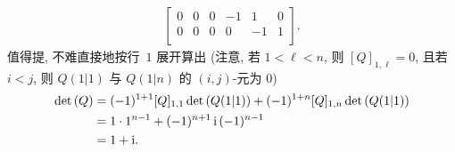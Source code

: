 \documentclass[../libro.tex]{subfiles}
\begin{document}
\begin{example}
\begin{align*}
\begin{bmatrix}
            0  & 0  & 0  & -1 & 1  & 0          \\
            0  & 0  & 0  & 0  & -1 & 1          \\
        \end{bmatrix}.
    \end{align*}
    值得提, 不难直接地按行~\(1\) 展开算出
    (注意, 若 \(1 < \ell < n\), %
    则 \([Q]_{1,\ell} = 0\),
    且若 \(i < j\),
    则 \(Q(1|1)\) 与 \(Q(1|n)\) 的
    \((i, j)\)-元为 \(0\)) %
    \begin{align*}
        \det {(Q)}
        = {} &
        (-1)^{1+1} [Q]_{1,1} \det {(Q(1|1))}
        + (-1)^{1+n} [Q]_{1,n} \det {(Q(1|1))}
        \\
        = {} &
        1 \cdot 1^{n-1} + (-1)^{n+1}\, \mathrm{i}\, (-1)^{n-1}
        \\
        = {} &
        1 + \mathrm{i}.
        \qedhere
    \end{align*}
\end{example}
\end{document}
